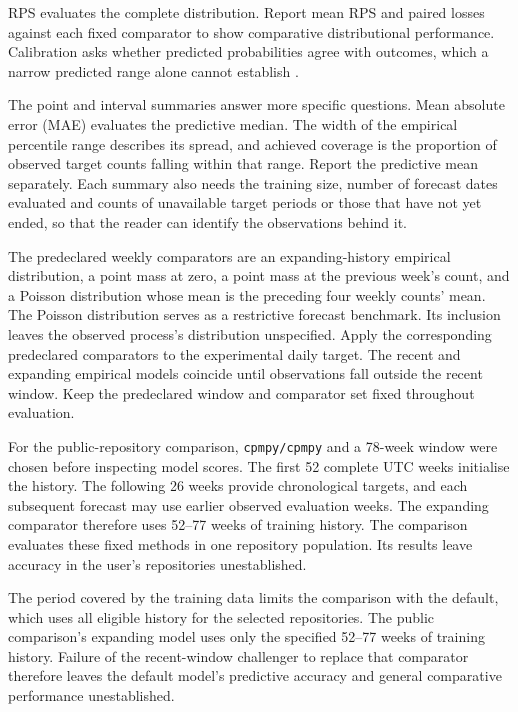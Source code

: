 \documentclass[11pt,a4paper]{article}
\begin{document}
RPS evaluates the complete distribution. Report mean RPS and paired losses against each fixed comparator to show comparative distributional performance. Calibration asks whether predicted probabilities agree with outcomes, which a narrow predicted range alone cannot establish \citep{gneitingcalibration2007}.

The point and interval summaries answer more specific questions. Mean absolute error (MAE) evaluates the predictive median. The width of the empirical percentile range describes its spread, and achieved coverage is the proportion of observed target counts falling within that range. Report the predictive mean separately. Each summary also needs the training size, number of forecast dates evaluated and counts of unavailable target periods or those that have not yet ended, so that the reader can identify the observations behind it.

The predeclared weekly comparators are an expanding-history empirical distribution, a point mass at zero, a point mass at the previous week's count, and a Poisson distribution whose mean is the preceding four weekly counts' mean. The Poisson distribution serves as a restrictive forecast benchmark. Its inclusion leaves the observed process's distribution unspecified. Apply the corresponding predeclared comparators to the experimental daily target. The recent and expanding empirical models coincide until observations fall outside the recent window. Keep the predeclared window and comparator set fixed throughout evaluation.

For the public-repository comparison, \texttt{cpmpy/cpmpy} and a 78-week window were chosen before inspecting model scores. The first 52 complete UTC weeks initialise the history. The following 26 weeks provide chronological targets, and each subsequent forecast may use earlier observed evaluation weeks. The expanding comparator therefore uses 52--77 weeks of training history. The comparison evaluates these fixed methods in one repository population. Its results leave accuracy in the user's repositories unestablished.

The period covered by the training data limits the comparison with the default, which uses all eligible history for the selected repositories. The public comparison's expanding model uses only the specified 52--77 weeks of training history. Failure of the recent-window challenger to replace that comparator therefore leaves the default model's predictive accuracy and general comparative performance unestablished.
\end{document}
